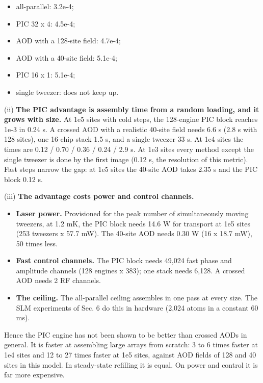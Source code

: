 \begin{itemize}
\tightlist
\item
  all-parallel: 3.2e-4;
\item
  PIC 32 x 4: 4.5e-4;
\item
  AOD with a 128-site field: 4.7e-4;
\item
  AOD with a 40-site field: 5.1e-4;
\item
  PIC 16 x 1: 5.1e-4;
\item
  single tweezer: does not keep up.
\end{itemize}

(ii) \textbf{The PIC advantage is assembly time from a random loading,
and it grows with size.} At 1e5 sites with cold steps, the 128-engine
PIC block reaches 1e-3 in 0.24 s. A crossed AOD with a realistic 40-site
field needs 6.6 s (2.8 s with 128 sites), one 16-chip stack 1.5 s, and a
single tweezer 33 s. At 1e4 sites the times are 0.12 / 0.70 / 0.36 /
0.24 / 2.9 s. At 1e3 sites every method except the single tweezer is
done by the first image (0.12 s, the resolution of this metric). Fast
steps narrow the gap: at 1e5 sites the 40-site AOD takes 2.35 s and the
PIC block 0.12 s.

(iii) \textbf{The advantage costs power and control channels.}

\begin{itemize}
\tightlist
\item
  \textbf{Laser power.} Provisioned for the peak number of
  simultaneously moving tweezers, at 1.2 mK, the PIC block needs 14.6 W
  for transport at 1e5 sites (253 tweezers x 57.7 mW). The 40-site AOD
  needs 0.30 W (16 x 18.7 mW), 50 times less.
\item
  \textbf{Fast control channels.} The PIC block needs 49,024 fast phase
  and amplitude channels (128 engines x 383); one stack needs 6,128. A
  crossed AOD needs 2 RF channels.
\item
  \textbf{The ceiling.} The all-parallel ceiling assembles in one pass
  at every size. The SLM experiments of Sec. 6 do this in hardware
  (2,024 atoms in a constant 60 ms).
\end{itemize}

Hence the PIC engine has not been shown to be better than crossed AODs
in general. It is faster at assembling large arrays from scratch: 3 to 6
times faster at 1e4 sites and 12 to 27 times faster at 1e5 sites,
against AOD fields of 128 and 40 sites in this model. In steady-state
refilling it is equal. On power and control it is far more expensive.

